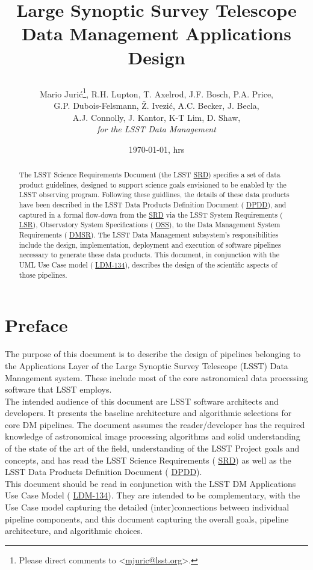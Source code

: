 \documentclass[12pt]{article}
\title{Large Synoptic Survey Telescope \\
Data Management Applications Design \\
{\author{
    Mario Juri\'c\footnote{Please direct comments to \textless\href{mailto:mjuric@lsst.org}{mjuric@lsst.org}\textgreater.},
    R.H. Lupton, T. Axelrod, J.F. Bosch, P.A. Price, \\
    G.P. Dubois-Felsmann, \v{Z}. Ivezi\'c, A.C. Becker, J. Becla,  \\ 
     A.J. Connolly, J. Kantor, K-T Lim, D. Shaw, \\
    {\em for the LSST Data Management}
}}}
\newcommand{\ds}[2]{{\color{blue} \href{https://docushare.lsstcorp.org/docushare/dsweb/Get/#1}{#2}}\xspace}
\newcommand{\SRD}{\ds{LPM-17}{SRD}}
\newcommand{\DPDD}{\ds{LSE-163}{DPDD}}
\newcommand{\LSR}{\ds{LSE-29}{LSR}}
\newcommand{\OSS}{\ds{LSE-30}{OSS}}
\newcommand{\DMSR}{\ds{LSE-61}{DMSR}}
\newcommand{\appsUMLusecase}{\ds{LDM-134}{LDM-134}}
\begin{document}
\date{\today, \currenttime hrs}
\maketitle
\pagestyle{headings}

\begin{abstract}
The LSST Science Requirements Document (the LSST \SRD) specifies a set of
data product guidelines, designed to support science goals envisioned to be enabled by the LSST observing program. Following these guidlines, the details of these data products have been described in the LSST Data Products Definition Document (\DPDD), and captured in a formal flow-down from the \SRD via the LSST System Requirements (\LSR), Observatory System Specifications (\OSS), to the Data Management System Requirements (\DMSR).
The LSST Data Management subsystem's responsibilities include the design, implementation, deployment and execution of software pipelines necessary to generate these data products. This document, in conjunction with the UML Use Case model (\appsUMLusecase), describes the design of the scientific aspects of those pipelines.
\end{abstract}

\clearpage

\tableofcontents

\clearpage

\section{Preface}

The purpose of this document is to describe the design of pipelines belonging to the Applications Layer of the Large Synoptic Survey Telescope (LSST) Data Management system. These include most of the core astronomical data processing software that LSST employs.
\\

The intended audience of this document are LSST software architects and developers. It presents the baseline architecture and algorithmic selections for core DM pipelines. The document assumes the reader/developer has the required knowledge of astronomical image processing algorithms and solid understanding of the state of the art of the field, understanding of the LSST Project goals and concepts, and has read the LSST Science Requirements (\SRD) as well as the LSST Data Products Definition Document (\DPDD).
\\

This document should be read in conjunction with the LSST DM Applications Use Case Model (\appsUMLusecase). They are intended to be complementary, with the Use Case model capturing the detailed (inter)connections between individual pipeline components, and this document capturing the overall goals, pipeline architecture, and algorithmic choices.
\\
\end{document}
